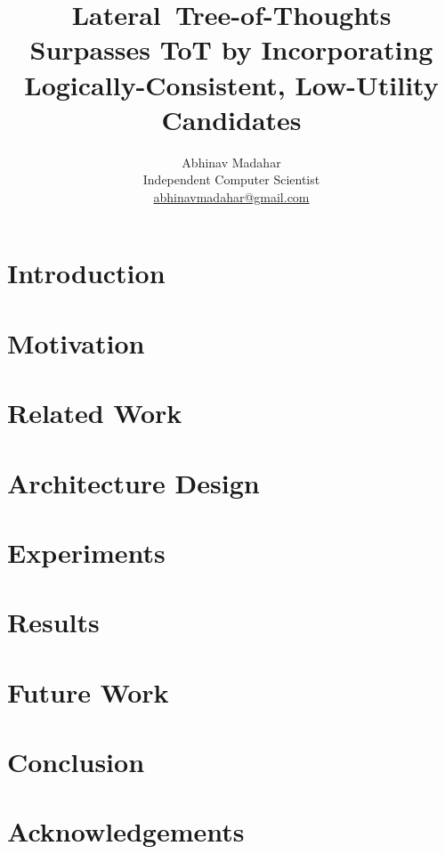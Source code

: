 \documentclass{article}
\title{Lateral~Tree-of-Thoughts Surpasses ToT by Incorporating Logically-Consistent, Low-Utility Candidates}
\author{Abhinav Madahar \\ Independent Computer Scientist \\ \href{mailto:abhinavmadahar@gmail.com}{abhinavmadahar@gmail.com}}
\begin{document}
\maketitle

\begin{abstract}
\end{abstract}

\section{Introduction}
\label{section:introduction}

\section{Motivation}
\label{section:motivation}

\section{Related Work}
\label{section:prior-work}

\section{Architecture Design}
\label{section:architecture-design}

\section{Experiments}
\label{section:experiments}

\section{Results}
\label{section:results}

\section{Future Work}
\label{section:future-work}

\section{Conclusion}
\label{section:conclusion}

\ificlrfinal
\section*{Acknowledgements}
\fi


\end{document}

